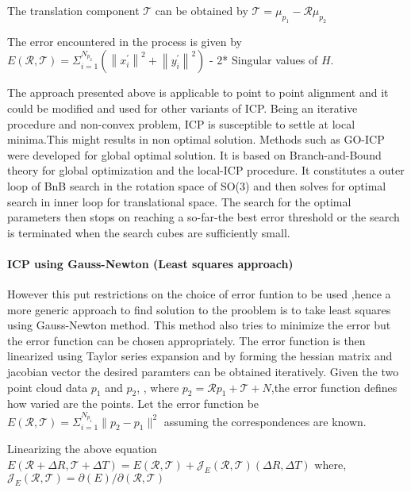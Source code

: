 The translation component $\mathcal{T}$ can be obtained by 
$\mathcal{T} = \mu_{p_1} - \mathcal{R}\mu_{p_2} $

The error encountered in the process is given by 
$E(\mathcal{R}, \mathcal{T}) = \Sigma_{i=1}^{N_{p_2}}(\left\lVert x_i^{'} \right\rVert^2 + \left\lVert y_i^{'} \right\rVert^2)$ - 2* Singular values of $H$.

The approach presented above is applicable to point to point alignment and it could be modified and used for other variants of ICP. Being an iterative procedure and non-convex problem, ICP is susceptible to settle at local 
minima.This might results in non optimal solution. Methods such as GO-ICP \cite{Yang_2016} were developed for global optimal solution. It is based on Branch-and-Bound theory for global optimization and the local-ICP procedure.
It constitutes a outer loop of BnB search in the rotation space of SO(3) and then solves for optimal search in inner loop for translational space. The search for the optimal parameters then stops on reaching
a so-far-the best error threshold or the search is terminated when the search cubes are sufficiently small. 
\par
\paragraph{ICP using Gauss-Newton (Least squares approach)}
However this put restrictions on the choice of error funtion to be used ,hence a more generic approach to find solution to the prooblem is
to take least squares using Gauss-Newton method. This method also tries to minimize the error but the error function can be chosen appropriately. The error function is then linearized
using Taylor series expansion and by forming the hessian matrix and jacobian vector the desired paramters can be obtained iteratively.
Given the two point cloud data $p_1$ and $p_2$, , where $p_2 = \mathcal{R}p_1 + \mathcal{T} + N$,the error function defines how varied are the points.
Let the error function be 
    $E(\mathcal{R}, \mathcal{T}) = \Sigma_{i=1}^{N_{p_1}}\lVert p_2 -  p_1 \rVert^2 $
assuming the correspondences are known.
\par
Linearizing the above equation
    $E(\mathcal{R}+\Delta{R} , \mathcal{T}+ \Delta{T}) = E(\mathcal{R}, \mathcal{T}) + \mathcal{J}_E(\mathcal{R}, \mathcal{T})(\Delta{R} ,\Delta{T})$
    where,
    $\mathcal{J}_E(\mathcal{R}, \mathcal{T}) = \partial (E) / \partial (\mathcal{R}, \mathcal{T})$

